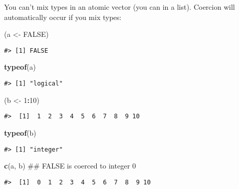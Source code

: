 \documentclass[]{book}
\newenvironment{Shaded}{\begin{snugshade}}{\end{snugshade}}
\newcommand{\KeywordTok}[1]{\textcolor[rgb]{0.13,0.29,0.53}{\textbf{#1}}}
\newcommand{\DecValTok}[1]{\textcolor[rgb]{0.00,0.00,0.81}{#1}}
\newcommand{\StringTok}[1]{\textcolor[rgb]{0.31,0.60,0.02}{#1}}
\newcommand{\OtherTok}[1]{\textcolor[rgb]{0.56,0.35,0.01}{#1}}
\newcommand{\OperatorTok}[1]{\textcolor[rgb]{0.81,0.36,0.00}{\textbf{#1}}}
\newcommand{\NormalTok}[1]{#1}
\theoremstyle{definition}
\theoremstyle{definition}
\theoremstyle{definition}
\theoremstyle{remark}
\begin{document}
You can't mix types in an atomic vector (you can in a list). Coercion
will automatically occur if you mix types:

\begin{Shaded}
\begin{Highlighting}[]
\NormalTok{(a <-}\StringTok{ }\OtherTok{FALSE}\NormalTok{)}
\end{Highlighting}
\end{Shaded}

\begin{verbatim}
#> [1] FALSE
\end{verbatim}

\begin{Shaded}
\begin{Highlighting}[]
\KeywordTok{typeof}\NormalTok{(a)}
\end{Highlighting}
\end{Shaded}

\begin{verbatim}
#> [1] "logical"
\end{verbatim}

\begin{Shaded}
\begin{Highlighting}[]
\NormalTok{(b <-}\StringTok{ }\DecValTok{1}\OperatorTok{:}\DecValTok{10}\NormalTok{)}
\end{Highlighting}
\end{Shaded}

\begin{verbatim}
#>  [1]  1  2  3  4  5  6  7  8  9 10
\end{verbatim}

\begin{Shaded}
\begin{Highlighting}[]
\KeywordTok{typeof}\NormalTok{(b)}
\end{Highlighting}
\end{Shaded}

\begin{verbatim}
#> [1] "integer"
\end{verbatim}

\begin{Shaded}
\begin{Highlighting}[]
\KeywordTok{c}\NormalTok{(a, b)  ## FALSE is coerced to integer 0}
\end{Highlighting}
\end{Shaded}

\begin{verbatim}
#>  [1]  0  1  2  3  4  5  6  7  8  9 10
\end{verbatim}
\end{document}

